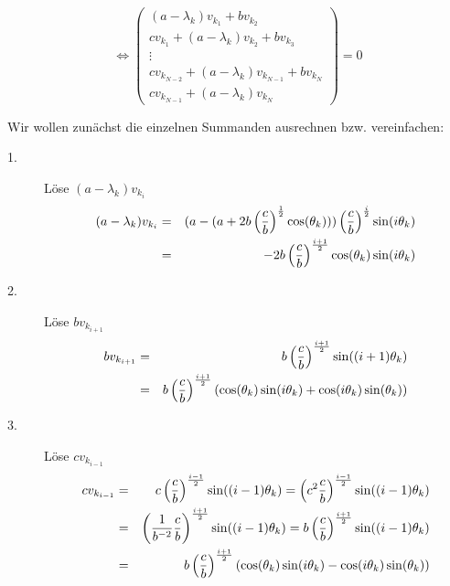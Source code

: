 \begin{equation}
\Longleftrightarrow
\begin{pmatrix}
(a - \lambda_{k}) v_{k_{1}} + b v_{k_{2}}\\
c v_{k_{1}} + (a - \lambda_{k}) v_{k_{2}} + b v_{k_{3}}\\
\vdots\\
c v_{k_{N-2}} + (a - \lambda_{k}) v_{k_{N-1}} + b v_{k_{N}}\\
c v_{k_{N-1}} + (a - \lambda_{k}) v_{k_{N}}
\end{pmatrix}
= 0
\end{equation}

Wir wollen zunächst die einzelnen Summanden ausrechnen bzw. vereinfachen:

\begin{description}
\item[1.] Löse $(a - \lambda_{k}) v_{k_{i}}$
\begin{eqnarray}
(a - \lambda_{k}) v_{k_{i}} &=& (a - (a + 2b\left(\frac{c}{b}\right)^{\frac{1}{2}} \cos(\theta_{k}))) \left(\frac{c}{b}\right)^{\frac{i}{2}} \sin(i \theta_{k})\notag \\
&=& -2b\left(\frac{c}{b}\right)^{\frac{i+1}{2}} \cos(\theta_{k})\sin(i \theta_{k}) \notag
\end{eqnarray}
\item[2.] Löse $b v_{k_{i+1}}$
\begin{eqnarray}
b v_{k_{i+1}} &=& b \left(\frac{c}{b}\right)^{\frac{i+1}{2}} \sin((i+1) \theta_{k})\notag \\
&=& b \left(\frac{c}{b}\right)^{\frac{i+1}{2}} (\cos(\theta_{k}) \sin(i \theta_{k}) + \cos(i \theta_{k}) \sin(\theta_{k})) \notag
\end{eqnarray}
\item[3.] Löse $c v_{k_{i-1}}$
\begin{eqnarray}
c v_{k_{i-1}} &=& c \left(\frac{c}{b}\right)^{\frac{i-1}{2}} \sin((i-1) \theta_{k}) = \left(c^{2}\frac{c}{b}\right)^{\frac{i-1}{2}} \sin((i-1) \theta_{k})\notag \\
&=& \left(\frac{1}{b^{-2}} \frac{c}{b}\right)^{\frac{i+1}{2}} \sin((i-1) \theta_{k}) = b \left(\frac{c}{b}\right)^{\frac{i+1}{2}} \sin((i-1) \theta_{k}) \notag \\
&=& b \left(\frac{c}{b}\right)^{\frac{i+1}{2}} (\cos(\theta_{k}) \sin(i \theta_{k}) - \cos(i \theta_{k}) \sin(\theta_{k})) \notag
\end{eqnarray}
\end{description}


